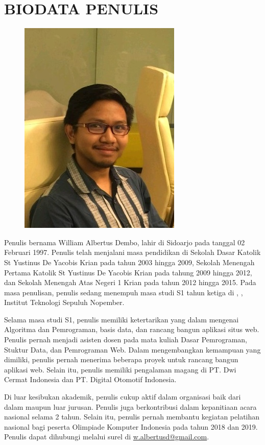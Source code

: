 
\chapter{BIODATA PENULIS}

\begin{figure}
	\includegraphics[height=0.25\textheight]{figures/william.jpg}
\end{figure}

Penulis bernama William Albertus Dembo, lahir di Sidoarjo pada tanggal 02 Februari 1997. Penulis telah menjalani masa pendidikan di Sekolah Dasar Katolik St Yustinus De Yacobis Krian pada tahun 2003 hingga 2009, Sekolah Menengah Pertama Katolik St Yustinus De Yacobis Krian pada tahung 2009 hingga 2012, dan Sekolah Menengah Atas Negeri 1 Krian pada tahun 2012 hingga 2015. Pada masa penulisan, penulis sedang menempuh masa studi S1 tahun ketiga di \jurusan, \fakultas, Institut Teknologi Sepuluh Nopember.

Selama masa studi S1, penulis memiliki ketertarikan yang dalam mengenai Algoritma dan Pemrograman, basis data, dan rancang bangun aplikasi situs web. Penulis pernah menjadi asisten dosen pada mata kuliah Dasar Pemrograman, Stuktur Data, dan Pemrograman Web. Dalam mengembangkan kemampuan yang dimiliki, penulis pernah menerima beberapa proyek untuk rancang bangun aplikasi web. Selain itu, penulis memiliki pengalaman magang di PT. Dwi Cermat Indonesia dan PT. Digital Otomotif Indonesia.

Di luar kesibukan akademik, penulis cukup aktif dalam organisasi baik dari dalam maupun luar jurusan. Penulis juga berkontribusi dalam kepanitiaan acara nasional selama 2 tahun. Selain itu, penulis pernah membantu kegiatan pelatihan nasional bagi peserta Olimpiade Komputer Indonesia pada tahun 2018 dan 2019. Penulis dapat dihubungi melalui surel di \href{mailto:w.albertusd@gmail.com}{w.albertusd@gmail.com}.